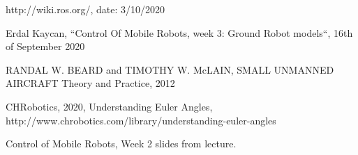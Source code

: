 \documentclass[conference]{IEEEtran}
\begin{document}
\begin{thebibliography}{00}

 http://wiki.ros.org/, date: 3/10/2020

 Erdal Kaycan, ``Control Of Mobile Robots, week 3: Ground Robot models``, 16th of September 2020

 RANDAL W. BEARD and TIMOTHY W. McLAIN, SMALL UNMANNED AIRCRAFT Theory and Practice, 2012

 CHRobotics, 2020, Understanding Euler Angles, http://www.chrobotics.com/library/understanding-euler-angles

 Control of Mobile Robots, Week 2 slides from lecture.

\end{thebibliography}
\vspace{12pt}
\end{document}
